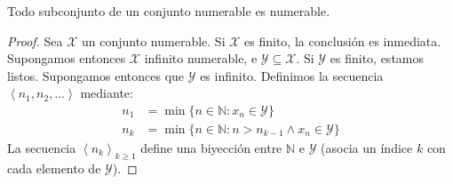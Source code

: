  \begin{theorem}
    \label{theo:subconjunto-numerable}
    Todo subconjunto de un conjunto numerable es numerable.
  \end{theorem}
  \begin{proof}
    Sea \(\mathcal{X}\) un conjunto numerable.
    Si \(\mathcal{X}\) es finito,
    la conclusión es inmediata.
    Supongamos entonces \(\mathcal{X}\) infinito numerable,
    e \(\mathcal{Y} \subseteq \mathcal{X}\).
    Si \(\mathcal{Y}\) es finito,
    estamos listos.
    Supongamos entonces que \(\mathcal{Y}\) es infinito.
    Definimos la secuencia
      \(\left\langle n_1, n_2, \dotsc \right\rangle\)
    mediante:
    \begin{align*}
      n_1
	&= \min \{n \in \mathbb{N} \colon x_n \in \mathcal{Y}\} \\
      n_k
	&= \min \{n \in \mathbb{N} \colon
		     n > n_{k - 1} \wedge x_n \in \mathcal{Y}\}
    \end{align*}
    La secuencia \(\left\langle n_k \right\rangle_{k \ge 1}\)
    define una biyección entre \(\mathbb{N}\) e \(\mathcal{Y}\)
    (asocia un índice \(k\) con cada elemento de \(\mathcal{Y}\)).
  \end{proof}

